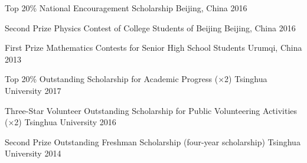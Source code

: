 




\begin{cvhonors}

  \cvhonor
    {Top 20\%}
    {National Encouragement Scholarship} %
    {Beijing, China} %
    {2016} %

  \cvhonor
    {Second Prize} %
    {Physics Contest of College Students of Beijing} %
    {Beijing, China} %
    {2016} %

  \cvhonor
    {First Prize} %
    {Mathematics Contests for Senior High School Students} %
    {Urumqi, China} %
    {2013} %


\end{cvhonors}



\begin{cvhonors}

  \cvhonor
    {Top 20\%}
    {Outstanding Scholarship for Academic Progress (×2)} %
    {Tsinghua University} %
    {2017} %

  \cvhonor
    {Three-Star Volunteer}
    {Outstanding Scholarship for Public Volunteering Activities (×2)} %
    {Tsinghua University} %
    {2016} %

  \cvhonor
    {Second Prize} %
    {Outstanding Freshman Scholarship (four-year scholarship)} %
    {Tsinghua University} %
    {2014} %

\end{cvhonors}
